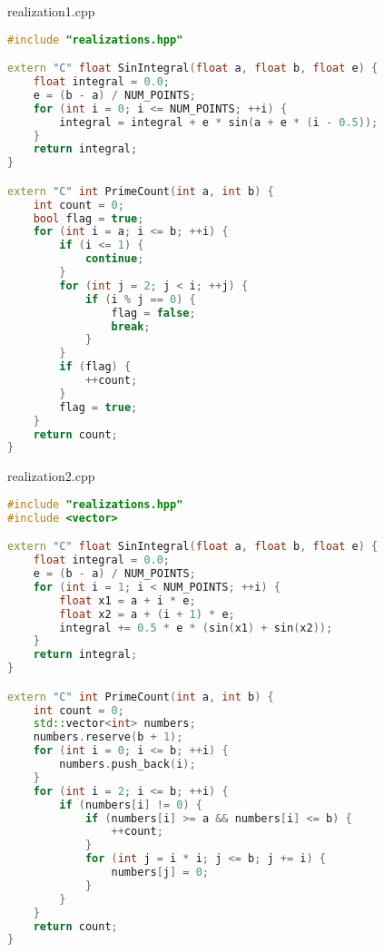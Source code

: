 \documentclass[a4paper, 12pt]{article}
\begin{document}
realization1.cpp
\begin{lstlisting}[language=C++]
#include "realizations.hpp"

extern "C" float SinIntegral(float a, float b, float e) {
    float integral = 0.0;
    e = (b - a) / NUM_POINTS;
    for (int i = 0; i <= NUM_POINTS; ++i) {
        integral = integral + e * sin(a + e * (i - 0.5));
    }
    return integral;
}

extern "C" int PrimeCount(int a, int b) {
    int count = 0;
    bool flag = true;
    for (int i = a; i <= b; ++i) {
        if (i <= 1) {
            continue;
        }
        for (int j = 2; j < i; ++j) {
            if (i % j == 0) {
                flag = false;
                break;
            }
        }
        if (flag) {
            ++count;
        }
        flag = true;
    }
    return count;
}
\end{lstlisting}

realization2.cpp
\begin{lstlisting}[language=C++]
#include "realizations.hpp"
#include <vector>

extern "C" float SinIntegral(float a, float b, float e) {
    float integral = 0.0;
    e = (b - a) / NUM_POINTS;
    for (int i = 1; i < NUM_POINTS; ++i) {
        float x1 = a + i * e;
        float x2 = a + (i + 1) * e;
        integral += 0.5 * e * (sin(x1) + sin(x2));
    }
    return integral;
}

extern "C" int PrimeCount(int a, int b) {
    int count = 0;
    std::vector<int> numbers;
    numbers.reserve(b + 1);
    for (int i = 0; i <= b; ++i) {
        numbers.push_back(i);
    }
    for (int i = 2; i <= b; ++i) {
        if (numbers[i] != 0) {
            if (numbers[i] >= a && numbers[i] <= b) {
                ++count;
            }
            for (int j = i * i; j <= b; j += i) {
                numbers[j] = 0;
            }
        }
    }
    return count;
}
\end{lstlisting}
\end{document}
